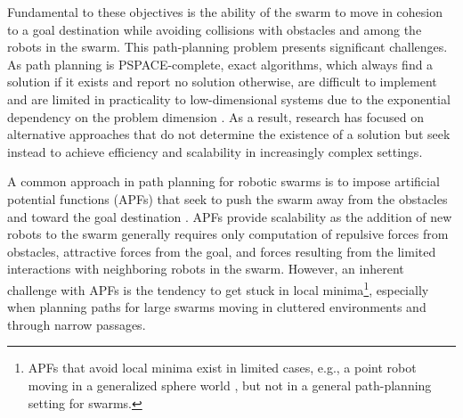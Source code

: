 \documentclass{llncs}
\begin{document}
Fundamental to these objectives is the ability of the swarm to move in
cohesion to a goal destination while avoiding collisions with
obstacles and among the robots in the swarm. This path-planning
problem presents significant challenges. As path
planning is PSPACE-complete, exact algorithms, which always find a
solution if it exists and report no solution otherwise, are difficult
to implement and are limited in practicality to low-dimensional
systems due to the exponential dependency on the problem dimension
\cite{Rei79,Can88,SchSha88}.
As a result, research has focused on alternative approaches that do
not determine the existence of a solution but seek instead
to achieve efficiency and scalability in increasingly complex
settings.




A common approach in path planning for robotic swarms is to impose
artificial potential functions (APFs) that seek to push the swarm away
from the obstacles and toward the goal destination \cite{Khatib86,reif1999social,book:SwarmsAPFs,tanner2005formation}. APFs provide
scalability as the addition of new robots to the swarm generally
requires only computation of repulsive forces from obstacles,
attractive forces from the goal, and forces resulting from the limited
interactions with neighboring robots in the swarm.  However, an
inherent challenge with APFs is the tendency to get stuck in local
minima\footnote{APFs that avoid local minima exist in limited cases, e.g., a
point robot moving in a generalized sphere world \cite{RK92}, but
not in a general path-planning setting for swarms.}, especially when planning paths for large swarms moving in
cluttered environments and through narrow passages.  
%
\end{document}
